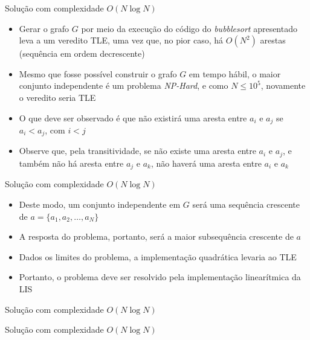 \begin{frame}[fragile]{Solução com complexidade $O(N\log N)$}

    \begin{itemize}
        \item Gerar o grafo $G$ por meio da execução do código do \textit{bubblesort}
            apresentado leva a um veredito TLE, uma vez que, no pior caso, há $O(N^2)$
            arestas (sequência em ordem decrescente)

        \item Mesmo que fosse possível construir o grafo $G$ em tempo hábil, o maior
            conjunto independente é um problema \textit{NP-Hard}, e como $N\leq 10^5$, novamente
            o veredito seria TLE

        \item O que deve ser observado é que não existirá uma aresta entre $a_i$ e $a_j$ se
            $a_i < a_j$, com $i < j$

        \item Observe que, pela transitividade, se não existe uma aresta entre $a_i$ e $a_j$,
            e também não há aresta entre $a_j$ e $a_k$, não haverá uma aresta entre $a_i$ e 
            $a_k$
   \end{itemize}

\end{frame}


\begin{frame}[fragile]{Solução com complexidade $O(N\log N)$}

    \begin{itemize}
        \item Deste modo, um conjunto independente em $G$ será uma sequência crescente de
            $a = \{ a_1, a_2, \ldots, a_N \}$

        \item A resposta do problema, portanto, será a maior subsequência crescente de $a$

        \item Dados os limites do problema, a implementação quadrática levaria ao TLE

        \item Portanto, o problema deve ser resolvido pela implementação linearítmica da
            LIS
    \end{itemize}

\end{frame}
\begin{frame}[fragile]{Solução com complexidade $O(N\log N)$}
\end{frame}

\begin{frame}[fragile]{Solução com complexidade $O(N\log N)$}
\end{frame}
